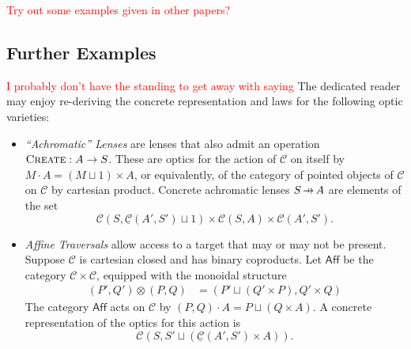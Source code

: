 \documentclass[11pt,a4paper]{article}
\theoremstyle{plain}
\theoremstyle{definition}
\newcommand{\C}{\mathscr{C}}
\newcommand{\homC}{\underline{\C}}
\newcommand{\Optic}{\mathbf{Optic}}
\newcommand{\fcreate}{\textsc{Create}}
\newcommand{\hto}{\ensuremath{\,\mathaccent\shortmid\rightarrow\,}}
\newcommand{\todo}[1]{\textcolor{red}{\small #1}}
\begin{document}
\todo{Try out some examples given in other papers?}

\subsection{Further Examples}
\todo{I probably don't have the standing to get away with saying} The dedicated reader may enjoy re-deriving the concrete representation and laws for the following optic varieties:

\begin{itemize}
\item \emph{``Achromatic'' Lenses} \cite[Section 5.2]{ProfunctorOpticsThesis} are lenses that also admit an operation $\fcreate : A \to S$. These are optics for the action of $\C$ on itself by $M \cdot A = (M \sqcup 1) \times A$, or equivalently, of the category of pointed objects of $\C$ on $\C$ by cartesian product. Concrete achromatic lenses $S \hto A$ are elements of the set \[\C(S, \homC(A', S') \sqcup 1) \times \C(S, A) \times \C(A', S').\]
\item \emph{Affine Traversals} \cite{AffineTraversalPost} allow access to a target that may or may not be present. Suppose $\C$ is cartesian closed and has binary coproducts. Let $\mathsf{Aff}$ be the category $\C \times \C$, equipped with the monoidal structure
\begin{align*}
  (P', Q') \otimes (P, Q) &= (P' \sqcup (Q' \times P) , Q' \times Q)
\end{align*}
The category $\mathsf{Aff}$ acts on $\C$ by $(P, Q) \cdot A = P \sqcup (Q \times A)$. A concrete representation of the optics for this action is \[\C(S, S' \sqcup (\homC(A', S') \times A)).\]


\end{itemize}
\end{document}
